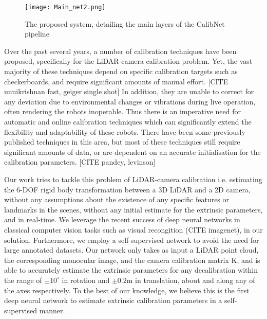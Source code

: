 \documentclass[letterpaper, 10 pt, conference]{ieeeconf}  %
\begin{document}
\begin{figure}
\begin{center}
    \setlength{\fboxsep}{2pt}%
    \setlength{\fboxrule}{1pt}%
    
    \texttt{[image: Main\_net2.png]}
\end{center}
    \caption{The proposed system, detailing the main layers of the CalibNet pipeline}
\label{fig:overall_net}
\end{figure}


Over the past several years, a number of calibration techniques have been proposed, specifically for the LiDAR-camera calibration problem.
Yet, the vast majority of these techniques depend on specific calibration targets such as checkerboards, and require significant
amounts of manual effort. [CITE unnikrishnan fast, geiger single shot] In addition, they are unable to correct for any deviation due to environmental changes or vibrations during live operation, often rendering the robots inoperable.
Thus there is an imperative need for automatic and online calibration techniques which can significantly extend the flexibility and adaptability of these robots. 
There have been some previously published techniques in this area, but most of these techniques still require significant amounts of data, or are dependent on an accurate initialisation for the calibration parameters. [CITE pandey, levinson]

Our work tries to tackle this problem of LiDAR-camera calibration i.e. 
estimating the 6-DOF rigid body transformation between a 3D LiDAR and a 2D camera, without any assumptions about the existence of any specific features or landmarks
in the scenes, without any initial estimate for the extrinsic parameters, and in real-time. We leverage the recent success of deep neural networks in classical computer vision tasks such as
visual recongition (CITE imagenet), in our solution. Furthermore, we employ a self-supervised network to avoid the need for large annotated datasets.
Our network only takes as input a LiDAR point cloud, the corresponding monocular image, and the camera calibration matrix K, and is able to accurately estimate the extrinsic parameters for any decalibration within the range of $\pm 10^{\circ}$ in rotation and $\pm 0.2$m in translation, about and along any of the axes respectively. 
To the best of our knowledge, we believe this is the first deep neural network to estimate extrinsic calibration parameters in a self-supervised manner.
\end{document}
